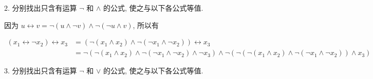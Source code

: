 \documentclass[boxes]{homework}
\begin{document}
\begin{problem}
2. 分别找出只含有运算 $\lnot$ 和 $\land$ 的公式, 使之与以下各公式等值.
\end{problem}

\begin{solution}
    因为 $u\leftrightarrow v = \lnot (u\land \lnot v)\land\lnot (\lnot u\land v)$, 所以有

    \begin{equation*}
        \begin{aligned}
            (x_1\leftrightarrow \lnot x_2)\leftrightarrow x_3 & = (\lnot (x_1\land x_2)\land\lnot (\lnot x_1\land\lnot x_2))\leftrightarrow x_3                                                                                     \\
                                                              & =  \lnot(\lnot (x_1\land x_2)\land\lnot (\lnot x_1\land\lnot x_2)\land\lnot x_3)\land\lnot (\lnot(\lnot(x_1\land x_2)\land\lnot(\lnot x_1\land\lnot x_2))\land x_3)
        \end{aligned}
    \end{equation*}
\end{solution}
\begin{problem}
3. 分别找出只含有运算 $\lnot$ 和 $\lor$ 的公式, 使之与以下各公式等值.
\end{problem}
\end{document}
